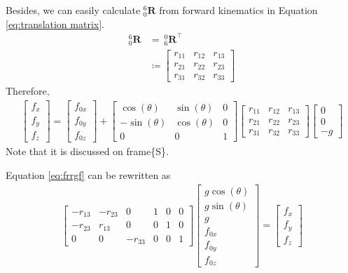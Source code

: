 Besides, we can easily calculate $^6_0\mathbf{R}$ from forward kinematics in Equation \ref{eq:translation matrix}.
\begin{equation}
\begin{split}
^6_0\mathbf{R} 	&=\ ^0_6\mathbf{R}^\top\\
				&\coloneqq
\begin{bmatrix}
r_{11}		&r_{12}		&r_{13} \\
r_{21}		&r_{22}		&r_{23} \\
r_{31}		&r_{32}		&r_{33}
\end{bmatrix}
\end{split}
\end{equation}
Therefore,
\begin{equation}
\label{eq:frrgf}
\begin{split}
\begin{bmatrix}
f_x\\
f_y\\
f_z
\end{bmatrix}
= 
\begin{bmatrix}
f_{0x}\\
f_{0y}\\
f_{0z}
\end{bmatrix}
+
\begin{bmatrix}
\cos(\theta)	&\sin(\theta)	&0 \\
-\sin(\theta)	&\cos(\theta)	&0 \\
0				&0				&1
\end{bmatrix}
\begin{bmatrix}
r_{11}		&r_{12}		&r_{13} \\
r_{21}		&r_{22}		&r_{23} \\
r_{31}		&r_{32}		&r_{33}
\end{bmatrix}
\begin{bmatrix}
0\\
0\\
-g
\end{bmatrix}
\end{split}
\end{equation}
Note that it is discussed on frame\{S\}.
\par
Equation \ref{eq:frrgf} can be rewritten as 
\begin{equation}
\label{eq:matrix_rgf0f}
\begin{split}
\begin{bmatrix}
-r_{13}		&-r_{23} 	&0			&1		&0		&0\\
-r_{23}		&r_{13}		&0			&0		&1		&0\\
0			&0			&-r_{33}	&0		&0		&1
\end{bmatrix}
\begin{bmatrix}
g\cos(\theta)\\
g\sin(\theta)\\
g\\
f_{0x}\\
f_{0y}\\
f_{0z}
\end{bmatrix}
=
\begin{bmatrix}
f_x\\
f_y\\
f_z
\end{bmatrix}
\end{split}
\end{equation}
